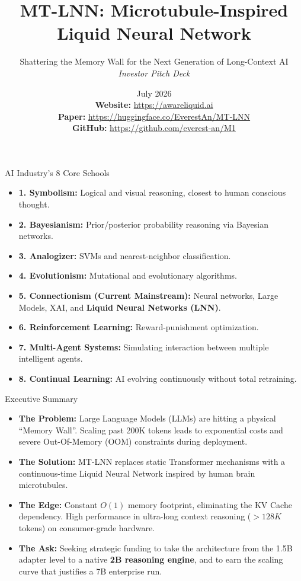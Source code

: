 ﻿\documentclass[aspectratio=169, 10pt]{beamer}
\title{MT-LNN: Microtubule-Inspired Liquid Neural Network}
\subtitle{Shattering the Memory Wall for the Next Generation of Long-Context AI \\ \textit{Investor Pitch Deck}}
\author{\Huge \aeonik{Awareness}}
\date{July 2026 \\[1em]
\footnotesize
\textbf{Website:} \url{https://awareliquid.ai} \\
\textbf{Paper:} \url{https://huggingface.co/EverestAn/MT-LNN} \\
\textbf{GitHub:} \url{https://github.com/everest-an/M1}
}
\begin{document}
\frame{\titlepage}

\begin{frame}{AI Industry's 8 Core Schools}
\begin{itemize}
    \item \textbf{1. Symbolism:} Logical and visual reasoning, closest to human conscious thought.
    \item \textbf{2. Bayesianism:} Prior/posterior probability reasoning via Bayesian networks.
    \item \textbf{3. Analogizer:} SVMs and nearest-neighbor classification.
    \item \textbf{4. Evolutionism:} Mutational and evolutionary algorithms.
    \item \textbf{5. Connectionism (Current Mainstream):} Neural networks, Large Models, XAI, and \textbf{Liquid Neural Networks (LNN)}.
    \item \textbf{6. Reinforcement Learning:} Reward-punishment optimization.
    \item \textbf{7. Multi-Agent Systems:} Simulating interaction between multiple intelligent agents.
    \item \textbf{8. Continual Learning:} AI evolving continuously without total retraining.
\end{itemize}
\end{frame}

\begin{frame}{Executive Summary}
\begin{itemize}
    \item \textbf{The Problem:} Large Language Models (LLMs) are hitting a physical ``Memory Wall''. Scaling past 200K tokens leads to exponential costs and severe Out-Of-Memory (OOM) constraints during deployment.
    \item \textbf{The Solution:} MT-LNN replaces static Transformer mechanisms with a continuous-time Liquid Neural Network inspired by human brain microtubules.
    \item \textbf{The Edge:} Constant $O(1)$ memory footprint, eliminating the KV Cache dependency. High performance in ultra-long context reasoning ($>128K$ tokens) on consumer-grade hardware.
    \item \textbf{The Ask:} Seeking strategic funding to take the architecture from the 1.5B adapter level to a native \textbf{2B reasoning engine}, and to earn the scaling curve that justifies a 7B enterprise run.
\end{itemize}
\end{frame}
\end{document}
